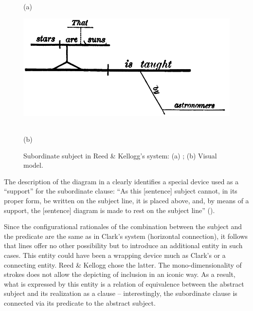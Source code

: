 \documentclass[english,output=paper,colorlinks,citecolor=brown]{../langscibook}
\begin{document}
\begin{figure}
     (a) \hspace{1em} \begin{minipage}[c]{.45\textwidth}\includegraphics[width=\textwidth]{figures/04/ReedKellog4.png}\end{minipage}\medskip\\
     (b) \hspace{1em} 
    \caption{Subordinate subject in Reed \& Kellogg’s system: (a) \citeyear[81]{ReedBrainerd1879}; (b) Visual model.\label{fig:4:10}}
\end{figure}

The description of the diagram in a clearly identifies a special device used as a “support” for the subordinate clause: “As this [sentence] subject cannot, in its proper form, be written on the subject line, it is placed above, and, by means of a support, the [sentence] diagram is made to rest on the subject line” (\citealt[107]{ReedBrainerd1879}).

Since the configurational rationales of the combination between the subject and the predicate are the same as in Clark’s system (horizontal connection), it follows that lines offer no other possibility but to introduce an additional entity in such cases. This entity could have been a wrapping device much as Clark’s or a connecting entity. Reed \& Kellogg chose the latter. The mono-dimensionality of strokes does not allow the depicting of inclusion in an iconic way. As a result, what is expressed by this entity is a relation of equivalence between the abstract subject and its realization as a clause – interestingly, the subordinate clause is connected via its predicate to the abstract subject.
\end{document}
